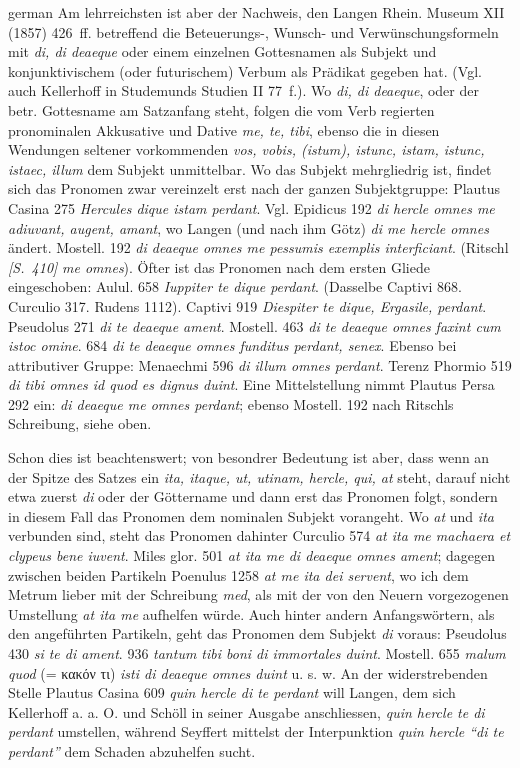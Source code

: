 \begin{otherlanguage*}{german}
Am lehrreichsten ist aber der Nachweis, den Langen Rhein. Museum XII (1857) 426~ff. betreffend die Beteuerungs-, Wunsch- und Verwünschungsformeln mit \emph{di, di deaeque} oder einem einzelnen Gottesnamen als Subjekt und konjunktivischem (oder futurischem) Verbum als Prädikat gegeben hat. (Vgl. auch Kellerhoff in Studemunds Studien II 77~f.). Wo \emph{di, di deaeque}, oder der betr. Gottesname am Satzanfang steht, folgen die vom Verb regierten pronominalen Akkusative und Dative \emph{me, te, tibi}, ebenso die in diesen Wendungen seltener vorkommenden \emph{vos, vobis, (istum), istunc, istam, istunc, istaec, illum} dem Subjekt unmittelbar. Wo das Subjekt mehrgliedrig ist, findet sich das Pronomen zwar vereinzelt erst nach der ganzen Subjektgruppe: Plautus Casina 275 \emph{Hercules dique istam perdant}. Vgl. Epidicus 192 \emph{di hercle omnes me adiuvant, augent, amant}, wo Langen (und nach ihm Götz) \emph{di me hercle omnes} ändert. Mostell. 192 \emph{di deaeque omnes me pessumis exemplis interficiant}. (Ritschl  \hypertarget{p410}{\emph{[S.~410]}}\label{p410} \emph{me omnes}). Öfter ist das Pronomen nach dem ersten Gliede eingeschoben: Aulul. 658 \emph{Iuppiter te dique perdant}. (Dasselbe Captivi 868. Curculio 317. Rudens 1112). Captivi 919 \emph{Diespiter te dique, Ergasile, perdant}. Pseudolus 271 \emph{di te deaeque ament}. Mostell. 463 \emph{di te deaeque omnes faxint cum istoc omine}. 684 \emph{di te deaeque omnes funditus perdant, senex}. Ebenso bei attributiver Gruppe: Menaechmi 596 \emph{di illum omnes perdant}. Terenz Phormio 519 \emph{di tibi omnes id quod es dignus duint}. Eine Mittelstellung nimmt Plautus Persa 292 ein: \emph{di deaeque me omnes perdant}; ebenso Mostell. 192 nach Ritschls Schreibung, siehe oben.

Schon dies ist beachtenswert; von besondrer Bedeutung ist aber, dass wenn an der Spitze des Satzes ein \emph{ita, itaque, ut, utinam, hercle, qui, at} steht, darauf nicht etwa zuerst \emph{di} oder der Göttername und dann erst das Pronomen folgt, sondern in diesem Fall das Pronomen dem nominalen Subjekt vorangeht. Wo \emph{at} und \emph{ita} verbunden sind, steht das Pronomen dahinter Curculio 574 \emph{at ita me machaera et clypeus bene iuvent}. Miles glor. 501 \emph{at ita me di deaeque omnes ament}; dagegen zwischen beiden Partikeln Poenulus 1258 \emph{at me ita dei servent}, wo ich dem Metrum lieber mit der Schreibung \emph{med}, als mit der von den Neuern vorgezogenen Umstellung \emph{at ita me} aufhelfen würde. Auch hinter andern Anfangswörtern, als den angeführten Partikeln, geht das Pronomen dem Subjekt \emph{di} voraus: Pseudolus 430 \emph{si te di ament}. 936 \emph{tantum tibi boni di immortales duint}. Mostell. 655 \emph{malum quod} (= κακόν τι) \emph{isti di deaeque omnes duint} u. s. w. An der widerstrebenden Stelle Plautus Casina 609 \emph{quin hercle di te perdant} will Langen, dem sich Kellerhoff a. a. O. und Schöll in seiner Ausgabe anschliessen, \emph{quin hercle te di perdant} umstellen, während Seyffert mittelst der Interpunktion \emph{quin hercle “di te perdant”} dem Schaden abzuhelfen sucht.


\end{otherlanguage*}

